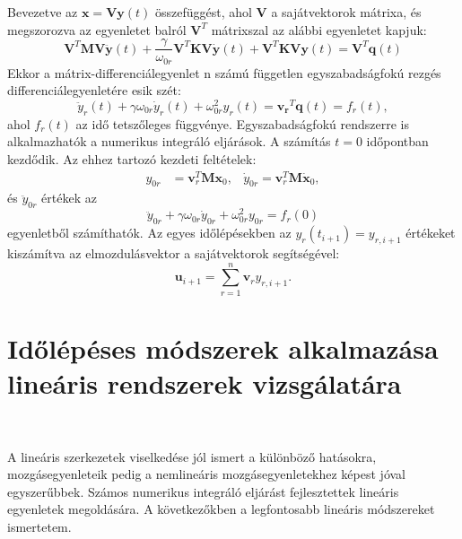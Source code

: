 Bevezetve az $\mathbf{x} = \mathbf{V}\mathbf{y}(t)$ összefüggést, ahol $\mathbf{V}$ a sajátvektorok mátrixa, és megszorozva az egyenletet balról $
\mathbf{V}^T$ mátrixszal az alábbi egyenletet kapjuk:
%
\begin{equation*}
\mathbf{V}^T\mathbf{M}\mathbf{V}\mathbf{\ddot{y}}(t)+\frac{\gamma}{\omega_{0r}}\mathbf{V}^T\mathbf{K}\mathbf{V}\mathbf{\dot{y}}(t)+\mathbf{V}^T\mathbf{K}\mathbf{V}\mathbf{y}(t) = \mathbf{V}^T\mathbf{q}(t)
\end{equation*}
%
Ekkor a mátrix-differenciálegyenlet n számú független egyszabadságfokú rezgés differenciálegyenletére esik szét:
%
\begin{equation*}
\ddot{y}_r(t)+\gamma\omega_{0r}\dot{y}_r(t)+\omega_{0r}^2y_r(t) = \mathbf{v_r}^T\mathbf{q}(t) = f_r(t),
\end{equation*}
%
ahol $f_r(t)$ az idő tetszőleges függvénye. Egyszabadságfokú rendszerre is alkalmazhatók a numerikus integráló eljárások. A számítás $t = 0$ időpontban kezdődik. Az ehhez tartozó kezdeti feltételek:
\begin{align*}
%
y_{0r} & = \mathbf{v}_r^T\mathbf{M}\mathbf{x}_0, & \dot{y}_{0r} =  \mathbf{v}_r^T\mathbf{M}\mathbf{\dot{x}}_0,
\end{align*}
%
és $\ddot{y}_{0r}$ értékek az
%
\begin{equation*}
\ddot{y}_{0r}+\gamma\omega_{0r}\dot{y}_{0r}+\omega_{0r}^2y_{0r} =  f_r(0)
\end{equation*}
%
egyenletből számíthatók. Az egyes időlépésekben az $y_r(t_{i+1}) = y_{r,i+1}$ értékeket kiszámítva az elmozdulásvektor a sajátvektorok segítségével:
%
\begin{equation*}
\mathbf{u}_{i+1} = \sum_{r=1}^{n}\mathbf{v}_r{y}_{r,i+1}.
\end{equation*}



\section{Időlépéses módszerek alkalmazása lineáris rendszerek vizsgálatára}\label{sec:idolepmsz}

{\ }

A lineáris  szerkezetek viselkedése jól ismert a különböző hatásokra, mozgásegyenleteik pedig a nemlineáris mozgásegyenletekhez képest jóval egyszerűbbek. Számos numerikus integráló eljárást fejlesztettek lineáris egyenletek megoldására. A következőkben a legfontosabb lineáris  módszereket ismertetem.

